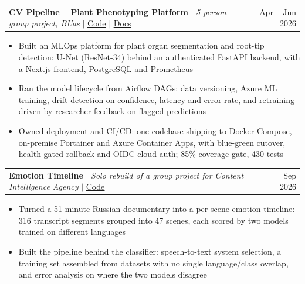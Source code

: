 \documentclass[letterpaper,11pt]{article}
\makeatletter
\newcommand{\resumeItem}[1]{
  \item\small{#1 \vspace{-2pt}}
}
\newcommand{\resumeProjectHeading}[2]{
    \item
    \begin{tabular*}{0.97\textwidth}{l@{\extracolsep{\fill}}r}
      \small#1 & #2 \\
    \end{tabular*}\vspace{-7pt}
}
\newcommand{\resumeItemListStart}{\begin{itemize}}
\newcommand{\resumeItemListEnd}{\end{itemize}\vspace{-5pt}}
\makeatother
\begin{document}
    \resumeProjectHeading
      {\textbf{CV Pipeline -- Plant Phenotyping Platform} $|$ \emph{5-person group project, BUas} $|$ \href{https://github.com/alex-krasnoshtanov/CV-Pipeline-Deployment-Platform}{\underline{Code}} $|$ \href{https://alex-krasnoshtanov.github.io/CV-Pipeline-Deployment-Platform/}{\underline{Docs}}}{Apr -- Jun 2026}
      \resumeItemListStart
        \resumeItem{Built an MLOps platform for plant organ segmentation and root-tip detection: U-Net (ResNet-34) behind an authenticated FastAPI backend, with a Next.js frontend, PostgreSQL and Prometheus}
        \resumeItem{Ran the model lifecycle from Airflow DAGs: data versioning, Azure ML training, drift detection on confidence, latency and error rate, and retraining driven by researcher feedback on flagged predictions}
        \resumeItem{Owned deployment and CI/CD: one codebase shipping to Docker Compose, on-premise Portainer and Azure Container Apps, with blue-green cutover, health-gated rollback and OIDC cloud auth; 85\% coverage gate, 430 tests}
      \resumeItemListEnd

    \resumeProjectHeading
      {\textbf{Emotion Timeline} $|$ \emph{Solo rebuild of a group project for Content Intelligence Agency} $|$ \href{https://github.com/alex-krasnoshtanov/Emotion-Timeline}{\underline{Code}}}{Sep 2026}
      \resumeItemListStart
        \resumeItem{Turned a 51-minute Russian documentary into a per-scene emotion timeline: 316 transcript segments grouped into 47 scenes, each scored by two models trained on different languages}
        \resumeItem{Built the pipeline behind the classifier: speech-to-text system selection, a training set assembled from datasets with no single language/class overlap, and error analysis on where the two models disagree}
      \resumeItemListEnd
\end{document}
